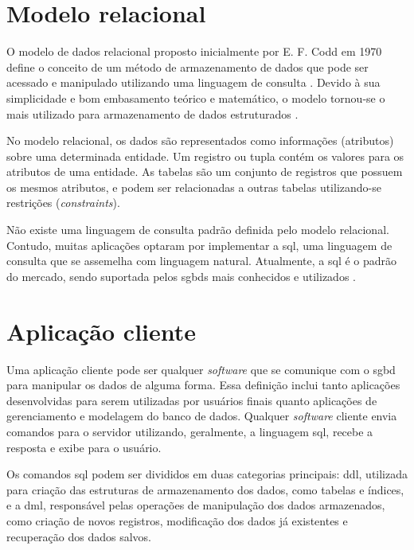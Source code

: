 \section{Modelo relacional}
\label{modelo-relacional}

O modelo de dados relacional proposto inicialmente por E. F. Codd em 1970 define o conceito de um método de armazenamento de dados que pode ser acessado e manipulado utilizando uma linguagem de consulta \cite[p. 25]{Bell:2012}. Devido à sua simplicidade e bom embasamento teórico e matemático, o modelo tornou-se o mais utilizado para armazenamento de dados estruturados \cite{Lightstone:2007}.

No modelo relacional, os dados são representados como informações (atributos) sobre uma determinada entidade. Um registro ou tupla contém os valores para os atributos de uma entidade. As tabelas são um conjunto de registros que possuem os mesmos atributos, e podem ser relacionadas a outras tabelas utilizando-se restrições (\emph{constraints}).

Não existe uma linguagem de consulta padrão definida pelo modelo relacional. Contudo, muitas aplicações optaram por implementar a \gls{sql}, uma linguagem de consulta que se assemelha com linguagem natural. Atualmente, a \gls{sql} é o padrão do mercado, sendo suportada pelos \glspl{sgbd} mais conhecidos e utilizados \cite[p. 26]{Bell:2012}.



\section{Aplicação cliente}
\label{aplicacao-cliente}

Uma aplicação cliente pode ser qualquer \emph{software} que se comunique com o \gls{sgbd} para manipular os dados de alguma forma. Essa definição inclui tanto aplicações desenvolvidas para serem utilizadas por usuários finais quanto aplicações de gerenciamento e modelagem do banco de dados. Qualquer \emph{software} cliente envia comandos para o servidor utilizando, geralmente, a linguagem \gls{sql}, recebe a resposta e exibe para o usuário.

Os comandos \gls{sql} podem ser divididos em duas categorias principais: \gls{ddl}, utilizada para criação das estruturas de armazenamento dos dados, como tabelas e índices, e a \gls{dml}, responsável pelas operações de manipulação dos dados armazenados, como criação de novos registros, modificação dos dados já existentes e recuperação dos dados salvos.

